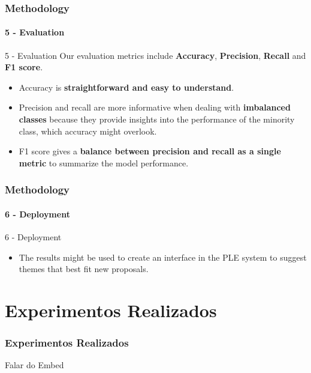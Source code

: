 \begin{frame}
	\frametitle{Methodology}
	\framesubtitle{5 - Evaluation}	
	
	\begin{block}{5 - Evaluation} 
			Our evaluation metrics include \textbf{Accuracy}, \textbf{Precision}, \textbf{Recall} and \textbf{F1 score}.
	\end{block}

	\begin{block}{} 
		\begin{itemize}
			\item Accuracy is \textbf{straightforward and easy to understand}.
			\item Precision and recall are more informative when dealing with \textbf{imbalanced classes} because they provide insights into the performance of the minority class, which accuracy might overlook.
			
			\item F1 score gives a \textbf{balance between precision and recall as a single metric} to summarize the model performance.
		\end{itemize}
	\end{block}
\end{frame}
\begin{frame}
	\frametitle{Methodology}
	\framesubtitle{6 - Deployment}	
	
	\begin{block}{6 - Deployment} 
		\begin{itemize}
			\item The results might be used to create an interface in the PLE system to suggest themes that best fit new proposals.
		\end{itemize}
	\end{block}
\end{frame}



\section{Experimentos Realizados}
\begin{frame}
	\frametitle{Experimentos Realizados}
	
	Falar do Embed
	
	
	
\end{frame}
